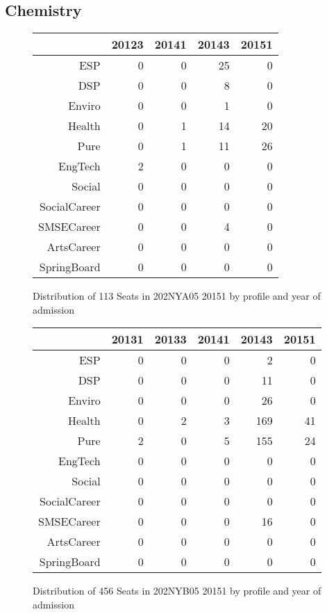 \documentclass{article}\usepackage[]{graphicx}\usepackage[]{color}
\begin{document}
\subsection{Chemistry}
\begin{figure}[H]
\centering
\begin{tabular}{rrrrr}
  \hline
 & 20123 & 20141 & 20143 & 20151 \\ 
  \hline
ESP &   0 &   0 &  25 &   0 \\ 
  DSP &   0 &   0 &   8 &   0 \\ 
  Enviro &   0 &   0 &   1 &   0 \\ 
  Health &   0 &   1 &  14 &  20 \\ 
  Pure &   0 &   1 &  11 &  26 \\ 
  EngTech &   2 &   0 &   0 &   0 \\ 
  Social &   0 &   0 &   0 &   0 \\ 
  SocialCareer &   0 &   0 &   0 &   0 \\ 
  SMSECareer &   0 &   0 &   4 &   0 \\ 
  ArtsCareer &   0 &   0 &   0 &   0 \\ 
  SpringBoard &   0 &   0 &   0 &   0 \\ 
   \hline
\end{tabular}
\caption{Distribution of 113 Seats in 202NYA05 20151 by profile and year of admission} 
\end{figure}
\begin{figure}[H]
\centering
\begin{tabular}{rrrrrr}
  \hline
 & 20131 & 20133 & 20141 & 20143 & 20151 \\ 
  \hline
ESP &   0 &   0 &   0 &   2 &   0 \\ 
  DSP &   0 &   0 &   0 &  11 &   0 \\ 
  Enviro &   0 &   0 &   0 &  26 &   0 \\ 
  Health &   0 &   2 &   3 & 169 &  41 \\ 
  Pure &   2 &   0 &   5 & 155 &  24 \\ 
  EngTech &   0 &   0 &   0 &   0 &   0 \\ 
  Social &   0 &   0 &   0 &   0 &   0 \\ 
  SocialCareer &   0 &   0 &   0 &   0 &   0 \\ 
  SMSECareer &   0 &   0 &   0 &  16 &   0 \\ 
  ArtsCareer &   0 &   0 &   0 &   0 &   0 \\ 
  SpringBoard &   0 &   0 &   0 &   0 &   0 \\ 
   \hline
\end{tabular}
\caption{Distribution of 456 Seats in 202NYB05 20151 by profile and year of admission} 
\end{figure}
\end{document}
